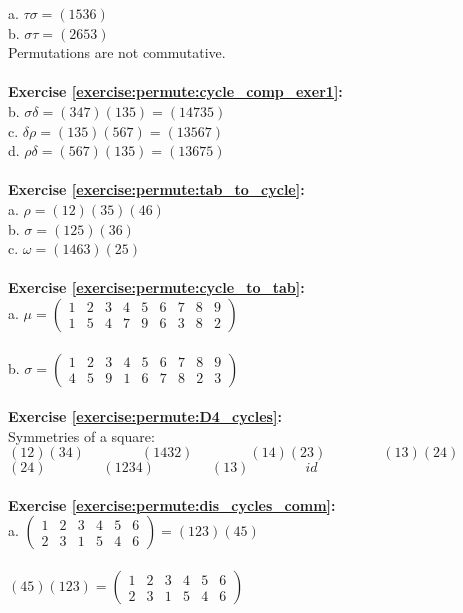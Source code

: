 a. $\tau\sigma=(1536)$\\
b. $\sigma\tau=(2653)$\\
Permutations are not commutative.\\
\\
\textbf{Exercise \ref{exercise:permute:cycle_comp_exer1}:}\\
b. $\sigma\delta=(347)(135)=(14735)$\\
c. $\delta\rho=(135)(567)=(13567)$\\
d. $\rho\delta=(567)(135)=(13675)$\\
\\
\textbf{Exercise \ref{exercise:permute:tab_to_cycle}:}\\
a. $\rho=(12)(35)(46)$\\
b. $\sigma=(125)(36)$\\
c. $\omega=(1463)(25)$\\
\\
\textbf{Exercise \ref{exercise:permute:cycle_to_tab}:}\\
a. $\mu=\begin{pmatrix}
1 & 2 & 3 & 4 & 5 & 6 & 7 & 8 & 9\\
1 & 5 & 4 & 7 & 9 & 6 & 3 & 8 & 2
\end{pmatrix}$\\
\\
b. $\sigma=\begin{pmatrix}
1 & 2 & 3 & 4 & 5 & 6 & 7 & 8 & 9\\
4 & 5 & 9 & 1 & 6 & 7 & 8 & 2 & 3
\end{pmatrix}$\\
\\
\textbf{Exercise \ref{exercise:permute:D4_cycles}:}\\
Symmetries of a square:\\
$(12)(34)\qquad\qquad(1432)\qquad\qquad(14)(23)\qquad\qquad(13)(24)$\\
$(24)\qquad\qquad(1234)\qquad\qquad(13)\qquad\qquad id$\\
\\
\textbf{Exercise \ref{exercise:permute:dis_cycles_comm}:}\\
a. $\begin{pmatrix}
1 & 2 & 3 & 4 & 5 & 6\\
2 & 3 & 1 & 5 & 4 & 6
\end{pmatrix}=(123)(45)$\\
\\
$(45)(123)=\begin{pmatrix}
1 & 2 & 3 & 4 & 5 & 6\\
2 & 3 & 1 & 5 & 4 & 6
\end{pmatrix}$\\

